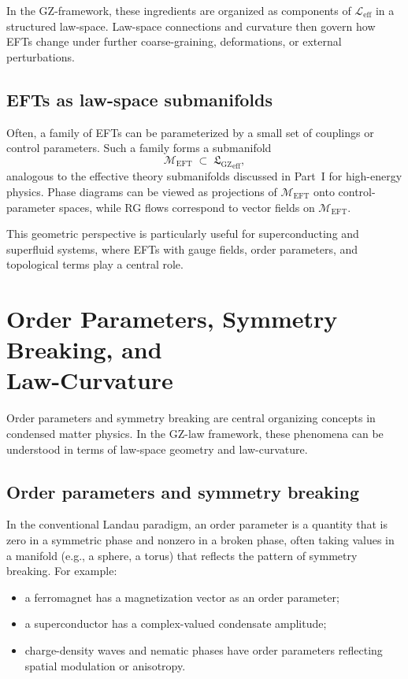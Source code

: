 \documentclass[11pt]{book}
\newcommand{\GZLS}{\ensuremath{\mathfrak{L}_{\mathrm{GZ}}}}
\theoremstyle{plain}
\theoremstyle{definition}
\theoremstyle{remark}
\begin{document}
In the GZ-framework, these ingredients are organized as components
of $\mathcal{L}_{\mathrm{eff}}$ in a structured law-space. Law-space
connections and curvature then govern how EFTs change under
further coarse-graining, deformations, or external perturbations.

\subsection*{EFTs as law-space submanifolds}

Often, a family of EFTs can be parameterized by a small set of
couplings or control parameters. Such a family forms a submanifold
\[
   \mathcal{M}_{\mathrm{EFT}} \;\subset\; {\GZLS}_{\mathrm{eff}},
\]
analogous to the effective theory submanifolds discussed in
Part~I for high-energy physics. Phase diagrams can be viewed as
projections of $\mathcal{M}_{\mathrm{EFT}}$ onto control-parameter
spaces, while RG flows correspond to vector fields on
$\mathcal{M}_{\mathrm{EFT}}$.

This geometric perspective is particularly useful for superconducting
and superfluid systems, where EFTs with gauge fields, order
parameters, and topological terms play a central role.

\section[Order Parameters and Law-Curvature]{Order Parameters, Symmetry Breaking, and \\ Law-Curvature}
\label{sec:order-parameters-law-curvature}


Order parameters and symmetry breaking are central organizing
concepts in condensed matter physics. In the GZ-law framework,
these phenomena can be understood in terms of law-space geometry
and law-curvature.

\subsection*{Order parameters and symmetry breaking}

In the conventional Landau paradigm, an order parameter is a
quantity that is zero in a symmetric phase and nonzero in a broken
phase, often taking values in a manifold (e.g., a sphere, a torus)
that reflects the pattern of symmetry breaking. For example:
\begin{itemize}
  \item a ferromagnet has a magnetization vector as an order
        parameter;
  \item a superconductor has a complex-valued condensate amplitude;
  \item charge-density waves and nematic phases have order
        parameters reflecting spatial modulation or anisotropy.
\end{itemize}
\end{document}
